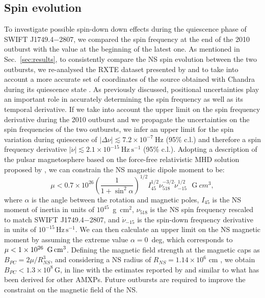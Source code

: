 \documentclass[fleqn,usenatbib]{mnras}
\newcommand{\swiftj}{SWIFT J1749.4$-$2807}
\newcommand{\rxte}{RXTE}
\newcommand{\chandra}{Chandra}
\begin{document}
\subsection{Spin evolution}
\label{sec:spinevo}
To investigate possible spin-down down effects during the quiescence phase of \swiftj{}, we compared the spin frequency at the end of the 2010 outburst with the value at the beginning of the latest one. As mentioned in Sec.~\ref{sec:results}, to consistently compare the NS spin evolution between the two outbursts, we re-analysed the \rxte{} dataset presented by \citet{Markwardt:2010tl} and \citet{Altamirano:2011uq} to take into account a more accurate set of coordinates of the source obtained with \chandra{} during its quiescence state \citep{Jonker:2013wp}. As previously discussed, positional uncertainties play an important role in accurately determining the spin frequency as well as its temporal derivative. 
If we take into account the upper limit on the spin frequency derivative during the 2010 outburst and we propagate the uncertainties on the spin frequencies of the two outbursts, we infer an upper limit for the spin variation during quiescence of $|\Delta \nu|\lesssim7.2\times 10^{-7}~\text{Hz}$ (95\% c.l.) and therefore a spin frequency derivative $|\dot{\nu}|\lesssim 2.1\times 10^{-15}~\text{Hz}~\text{s}^{-1}$ (95\% c.l.).
Adopting a description of the pulsar magnetosphere based on the force-free relativistic MHD solution proposed by \citet{Spitkovsky:2006uz}, we can constrain the NS magnetic dipole moment to be:
\begin{equation}
\mu < 0.7\times10^{26}\left(\frac{1}{1+\sin^2{\alpha}}\right)^{1/2} I_{45}^{1/2}\nu_{518}^{-3/2}\dot{\nu}_{-15}^{1/2}\,\,\,\, \text{G}~{cm}^3,
\label{eq:mag}
\end{equation}
where $\alpha$ is the angle between the rotation and magnetic poles, $I_{45}$ is the NS moment of inertia in units of $10^{45}$~g~cm$^2$, $\nu_{518}$ is the NS spin frequency rescaled to match \swiftj{}, and $\dot{\nu}_{-15}$ is the spin-down frequency derivative in units of $10^{-15}\,\text{Hz}\,\text{s}^{-1}$. We can then calculate an upper limit on the NS magnetic moment by assuming the extreme value $\alpha=0$~deg, which corresponds to $\mu < 1\times10^{26}\,\,\, \textrm{G\,cm$^3$}$.
Defining the magnetic field strength at the magnetic caps as $B_{PC}= 2 \mu/R_{NS}^{3}$, and considering a NS radius of $R_{NS}=1.14\times10^{6}$ cm  \citep[corresponding to the FPS equation of state for a 1.4~M$_\odot{}$ NS, see e.g.,][]{Friedman1981a, Pandharipande1989a}, we obtain $B_{PC}<1.3\times 10^{8}\,\text{G}$, in line with the estimates reported by \citet{Mukherjee:2015td} and similar to what has been derived for other AMXPs. Future outbursts are required to improve the constraint on the magnetic field of the NS. 
\end{document}
